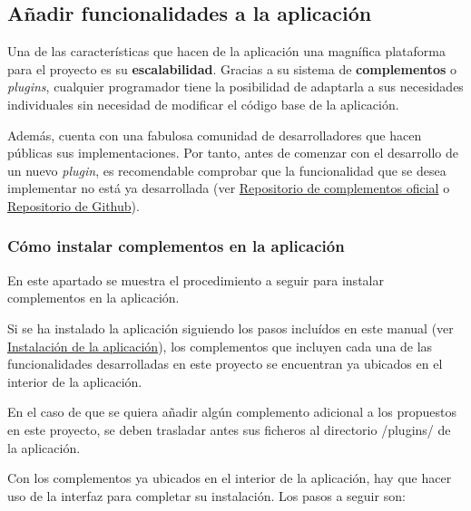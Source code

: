 \documentclass[
]{article}
\begin{document}
\hypertarget{auxf1adir-funcionalidades-a-la-aplicaciuxf3n}{%
\subsection{Añadir funcionalidades a la
aplicación}\label{auxf1adir-funcionalidades-a-la-aplicaciuxf3n}}

Una de las características que hacen de la aplicación una magnífica
plataforma para el proyecto es su \textbf{escalabilidad}. Gracias a su
sistema de \textbf{complementos} o \emph{plugins}, cualquier programador
tiene la posibilidad de adaptarla a sus necesidades individuales sin
necesidad de modificar el código base de la aplicación.

Además, cuenta con una fabulosa comunidad de desarrolladores que hacen
públicas sus implementaciones. Por tanto, antes de comenzar con el
desarrollo de un nuevo \emph{plugin}, es recomendable comprobar que la
funcionalidad que se desea implementar no está ya desarrollada (ver
\href{https://omeka.org/classic/plugins/}{Repositorio de complementos
oficial} o
\href{https://daniel-km.github.io/UpgradeToOmekaS/omeka_plugins.html}{Repositorio
de Github}).

\hypertarget{cuxf3mo-instalar-complementos-en-la-aplicaciuxf3n}{%
\subsubsection{Cómo instalar complementos en la
aplicación}\label{cuxf3mo-instalar-complementos-en-la-aplicaciuxf3n}}

En este apartado se muestra el procedimiento a seguir para instalar
complementos en la aplicación.

Si se ha instalado la aplicación siguiendo los pasos incluídos en este
manual (ver
\protect\hyperlink{instalaciuxf3n-de-la-aplicaciuxf3n}{Instalación de la
aplicación}), los complementos que incluyen cada una de las
funcionalidades desarrolladas en este proyecto se encuentran ya ubicados
en el interior de la aplicación.

En el caso de que se quiera añadir algún complemento adicional a los
propuestos en este proyecto, se deben trasladar antes sus ficheros al
directorio {/plugins/} de la aplicación.

Con los complementos ya ubicados en el interior de la aplicación, hay
que hacer uso de la interfaz para completar su instalación. Los pasos a
seguir son:
\end{document}
